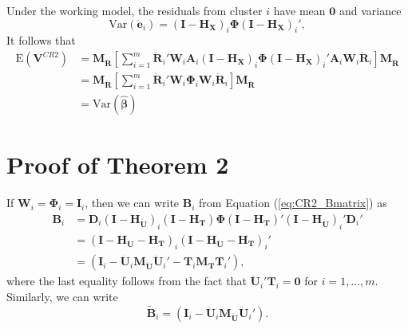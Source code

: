 \documentclass[12pt]{article}
\begin{document}
Under the working model, the residuals from cluster \(i\) have mean
\(\mathbf{0}\) and variance \[
\text{Var}\left(\mathbf{\ddot{e}}_i\right) = \left(\mathbf{I} - \mathbf{H_X}\right)_i \boldsymbol\Phi \left(\mathbf{I} - \mathbf{H_X}\right)_i',\]
It follows that \begin{align*}
\text{E}\left(\mathbf{V}^{CR2}\right) &= \mathbf{M_{\ddot{R}}}\left[\sum_{i=1}^m \mathbf{\ddot{R}}_i' \mathbf{W}_i \mathbf{A}_i \left(\mathbf{I} - \mathbf{H_X}\right)_i \boldsymbol\Phi \left(\mathbf{I} - \mathbf{H_X}\right)_i' \mathbf{A}_i \mathbf{W}_i \mathbf{\ddot{R}}_i \right] \mathbf{M_{\ddot{R}}} \\
&= \mathbf{M_{\ddot{R}}}\left[\sum_{i=1}^m \mathbf{\ddot{R}}_i' \mathbf{W}_i \boldsymbol\Phi_i \mathbf{W}_i \mathbf{\ddot{R}}_i \right] \mathbf{M_{\ddot{R}}} \\
&= \text{Var}\left(\boldsymbol{\hat\beta}\right)
\end{align*}

\newpage

\hypertarget{app:proof2}{%
\section{Proof of Theorem 2}\label{app:proof2}}

If \(\mathbf{W}_i = \boldsymbol\Phi_i = \mathbf{I}_i\), then we can
write \(\mathbf{B}_i\) from Equation (\ref{eq:CR2_Bmatrix}) as
\begin{align}
\mathbf{B}_i &= \mathbf{D}_i \left(\mathbf{I} - \mathbf{H_{\ddot{U}}}\right)_i \left(\mathbf{I} - \mathbf{H_T}\right) \boldsymbol\Phi \left(\mathbf{I} - \mathbf{H_T}\right)' \left(\mathbf{I} - \mathbf{H_{\ddot{U}}}\right)_i' \mathbf{D}_i' \nonumber \\ 
&= \left(\mathbf{I} - \mathbf{H_{\ddot{U}}} - \mathbf{H_T}\right)_i \left(\mathbf{I} - \mathbf{H_{\ddot{U}}} - \mathbf{H_T}\right)_i'  \nonumber\\ 
\label{eq:B_i}
&= \left(\mathbf{I}_i - \mathbf{\ddot{U}}_i \mathbf{M_{\ddot{U}}}\mathbf{\ddot{U}}_i' - \mathbf{T}_i \mathbf{M_T}\mathbf{T}_i'\right),
\end{align} where the last equality follows from the fact that
\(\mathbf{\ddot{U}}_i'\mathbf{T}_i = \mathbf{0}\) for \(i = 1,...,m\).
Similarly, we can write \begin{equation}
\label{eq:Btilde_i}
\tilde{\mathbf{B}}_i = \left(\mathbf{I}_i - \mathbf{\ddot{U}}_i \mathbf{M_{\ddot{U}}}\mathbf{\ddot{U}}_i'\right).
\end{equation}
\end{document}

